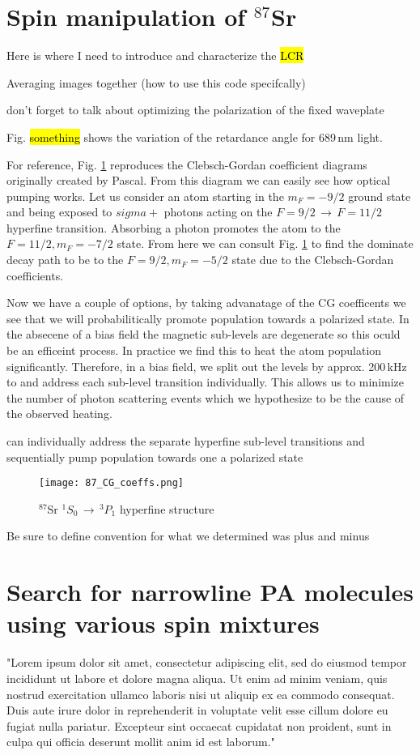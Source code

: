 \section{Spin manipulation of $^{87}$Sr}
\label{sec:spin_pol}

Here is where I need to introduce and characterize the \hl{LCR}

Averaging images together (how to use this code specifcally)

don't forget to talk about optimizing the polarization of the fixed waveplate

Fig. \hl{something} shows the variation of the retardance angle for 689\,nm light.

For reference, Fig. \ref{fig:mF87} reproduces the Clebsch-Gordan coefficient diagrams originally created by Pascal.
From this diagram we can easily see how optical pumping works.
Let us consider an atom starting in the $m_F=-9/2$ ground state and being exposed to $sigma+$ photons acting on the $F=9/2\,\rightarrow\,F=11/2$ hyperfine transition.
Absorbing a photon promotes the atom to the $F=11/2, m_F=-7/2$ state.
From here we can consult Fig. \ref{fig:mF87} to find the dominate decay path to be to the $F=9/2, m_F=-5/2$ state due to the Clebsch-Gordan coefficients.

Now we have a couple of options, by taking advanatage of the CG coefficents we see that we will probabilitically promote population towards a polarized state.
In the absecene of a bias field the magnetic sub-levels are degenerate so this oculd be an efficeint process.
In practice we find this to heat the atom population significantly.
Therefore, in a bias field, we split out the levels by approx. 200\,kHz to and address each sub-level transition individually.
This allows us to minimize the number of photon scattering events which we hypothesize to be the cause of the observed heating.

can individually address the separate hyperfine sub-level transitions and sequentially pump population towards one a polarized state 
	\begin{figure}
		\centerline{
		\texttt{[image: 87\_CG\_coeffs.png]}}
		\caption{$^{87}$Sr $^1S_0 \, \rightarrow \, ^3P_1$ hyperfine structure}
		\label{fig:mF87}
	\end{figure} 
	
Be sure to define convention for what we determined was plus and minus

\section{Search for narrowline PA molecules using various spin mixtures}
\label{sec:87PAS}

"Lorem ipsum dolor sit amet, consectetur adipiscing elit, sed do eiusmod tempor incididunt ut labore et dolore magna aliqua. Ut enim ad minim veniam, quis nostrud exercitation ullamco laboris nisi ut aliquip ex ea commodo consequat. Duis aute irure dolor in reprehenderit in voluptate velit esse cillum dolore eu fugiat nulla pariatur. Excepteur sint occaecat cupidatat non proident, sunt in culpa qui officia deserunt mollit anim id est laborum."
